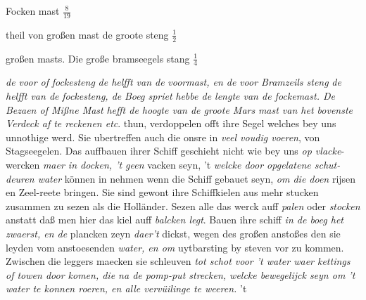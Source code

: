 \pend 
\pstart Focken mast\protect{} $\displaystyle\frac{8}{19}$\rule[-4mm]{0mm}{10mm} theil von großen mast\protect{} de groote steng\protect{} $\displaystyle\frac{1}{2}$\rule[-4mm]{0mm}{10mm}  großen masts\protect{}. Die große bramseegels stang\protect{} $\displaystyle\frac{1}{4}$\rule[-4mm]{0mm}{10mm} \textit{de voor of }\textit{fockesteng}\protect{}\textit{ de helfft van de }\textit{voormast}\protect{}\textit{, en de }\textit{voor Bramzeils steng}\protect{}\textit{ de helfft van de }\textit{fockesteng}\protect{}\textit{, de }\textit{Boeg spriet}\protect{} \textit{hebbe de lengte van de fockemast}\protect{}\textit{. De Bezaen of Mißne Mast}\protect{}\textit{ hefft de hoogte van de groote Mars} \textit{ mast van het bovenste Verdeck af te reckenen etc}.    thun, verdoppelen offt ihre Segel\protect{} welches bey uns unnothige  werd. Sie ubertreffen auch die onsre in \textit{veel voudig voeren}, von Stagseegelen\protect{}. Das auffbauen ihrer Schiff\protect{} geschieht nicht wie bey uns \textit{op vlacke}-wercken \textit{maer in docken, 't geen} vacken seyn, 't \textit{welcke door opgelatene schut-deuren water} k\"{o}nnen in nehmen wenn die Schiff\protect{} gebauet seyn, \textit{om die doen} rijsen en Zeel-reete bringen. Sie sind gewont ihre Schiffkielen\protect{} aus mehr stucken zusammen zu sezen als die Holl\"{a}nder. Sezen alle das werck auff \textit{palen} oder \textit{stocken} anstatt daß men hier das kiel\protect{} auff \textit{balcken legt}. Bauen ihre schiff\protect{} \textit{in de boeg het zwaerst, en de} plancken zeyn \textit{daer't} dickst, wegen des großen anstoßes den sie leyden vom anstoesenden \textit{water, en om} uytbarsting by steven vor zu kommen. Zwischen die leggers maecken sie schleuven \textit{tot schot voor 't water waer kettings of towen door komen, die na de pomp-put strecken, welcke bewegelijck seyn om 't water te konnen roeren, en alle verv\"{u}ilinge te weeren.} 't 